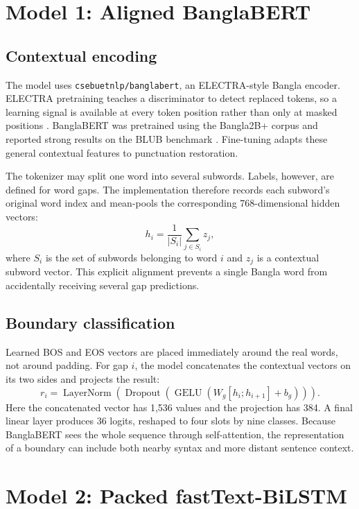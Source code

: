 \documentclass[11pt,a4paper]{article}
\begin{document}
\section{Model 1: Aligned BanglaBERT}
\subsection{Contextual encoding}
The model uses \texttt{csebuetnlp/banglabert}, an ELECTRA-style Bangla encoder. ELECTRA pretraining teaches a discriminator to detect replaced tokens, so a learning signal is available at every token position rather than only at masked positions \cite{electra}. BanglaBERT was pretrained using the Bangla2B+ corpus and reported strong results on the BLUB benchmark \cite{banglabert}. Fine-tuning adapts these general contextual features to punctuation restoration.

The tokenizer may split one word into several subwords. Labels, however, are defined for word gaps. The implementation therefore records each subword's original word index and mean-pools the corresponding 768-dimensional hidden vectors:
\[
h_i=\frac{1}{|S_i|}\sum_{j\in S_i} z_j,
\]
where $S_i$ is the set of subwords belonging to word $i$ and $z_j$ is a contextual subword vector. This explicit alignment prevents a single Bangla word from accidentally receiving several gap predictions.

\subsection{Boundary classification}
Learned BOS and EOS vectors are placed immediately around the real words, not around padding. For gap $i$, the model concatenates the contextual vectors on its two sides and projects the result:
\[
r_i=\operatorname{LayerNorm}\!\left(\operatorname{Dropout}\left(\operatorname{GELU}\left(W_g[h_i;h_{i+1}]+b_g\right)\right)\right).
\]
Here the concatenated vector has 1,536 values and the projection has 384. A final linear layer produces 36 logits, reshaped to four slots by nine classes. Because BanglaBERT sees the whole sequence through self-attention, the representation of a boundary can include both nearby syntax and more distant sentence context.

\clearpage

\section{Model 2: Packed fastText-BiLSTM}
\end{document}
